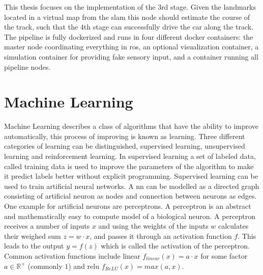 This thesis focuses on the implementation of the 3rd stage. Given the landmarks located in a virtual map from the \ac{slam} this node should estimate the course of the track, such that the 4th stage can successfully drive the car along the track.
The pipeline is fully dockerized and runs in four different docker containers: the master node coordinating everything in \ac{ros}, an optional visualization container, a simulation container for providing fake sensory input, and a container running all pipeline nodes.

\section{Machine Learning}
Machine Learning describes a class of algorithms that have the ability to improve automatically, this process of improving is known as learning. Three different categories of learning can be distinguished, supervised learning, unsupervised learning and reinforcement learning. In supervised learning a set of labeled data, called training data is used to improve the parameters of the algorithm to make it predict labels better without explicit programming. Supervised learning can be used to train artificial neural networks. A \ac{nn} can be modelled as a directed graph consisting of artificial neuron as nodes and connection between neurons as edges. One example for artificial neurons are perceptrons. A perceptron is an abstract and mathematically easy to compute model of a biological neuron. A perceptron receives a number of inputs $x$ and using the weights of the inputs $w$ calculates their weighed sum $z=w \cdot x$, and passes it through an activation function $f$. This leads to the output
$y=f(z)$ which is called the activation of the perceptron. Common activation functions include linear $f_{linear}(x)=a \cdot x$ for some factor $a \in \mathbb{R^+}$ (commonly $1$) and \ac{relu} $f_{ReLU}(x)=max(a,x)$.

